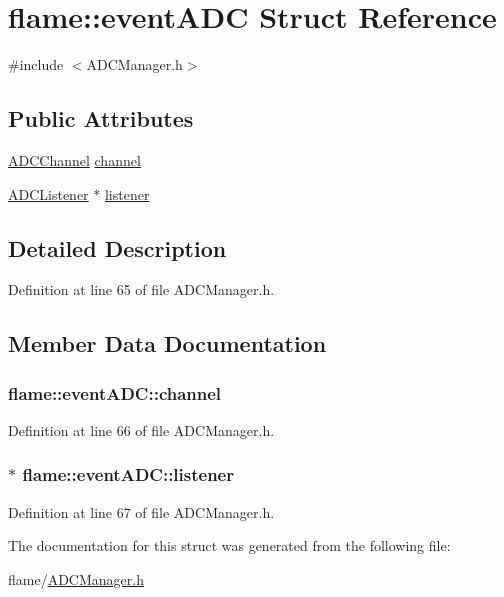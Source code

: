 \hypertarget{structflame_1_1event_a_d_c}{\section{flame\-:\-:event\-A\-D\-C Struct Reference}
\label{structflame_1_1event_a_d_c}
}


{\ttfamily \#include $<$A\-D\-C\-Manager.\-h$>$}

\subsection*{Public Attributes}
\begin{DoxyCompactItemize}
\item 
\hyperlink{atmega1280_8h_ab5a361d214bf33f4d9d443d9db44043d}{A\-D\-C\-Channel} \hyperlink{structflame_1_1event_a_d_c_a82ec57a6fcebb837bc0e8d175a469c74}{channel}
\item 
\hyperlink{classflame_1_1_a_d_c_listener}{A\-D\-C\-Listener} $\ast$ \hyperlink{structflame_1_1event_a_d_c_a4e6a027b0eb02bcb096ac169499635ee}{listener}
\end{DoxyCompactItemize}


\subsection{Detailed Description}


Definition at line 65 of file A\-D\-C\-Manager.\-h.



\subsection{Member Data Documentation}
\hypertarget{structflame_1_1event_a_d_c_a82ec57a6fcebb837bc0e8d175a469c74}{
\subsubsection[{channel}]{ flame\-::event\-A\-D\-C\-::channel}}\label{structflame_1_1event_a_d_c_a82ec57a6fcebb837bc0e8d175a469c74}


Definition at line 66 of file A\-D\-C\-Manager.\-h.

\hypertarget{structflame_1_1event_a_d_c_a4e6a027b0eb02bcb096ac169499635ee}{
\subsubsection[{listener}]{$\ast$ flame\-::event\-A\-D\-C\-::listener}}\label{structflame_1_1event_a_d_c_a4e6a027b0eb02bcb096ac169499635ee}


Definition at line 67 of file A\-D\-C\-Manager.\-h.



The documentation for this struct was generated from the following file\-:\begin{DoxyCompactItemize}
\item 
flame/\hyperlink{_a_d_c_manager_8h}{A\-D\-C\-Manager.\-h}\end{DoxyCompactItemize}
